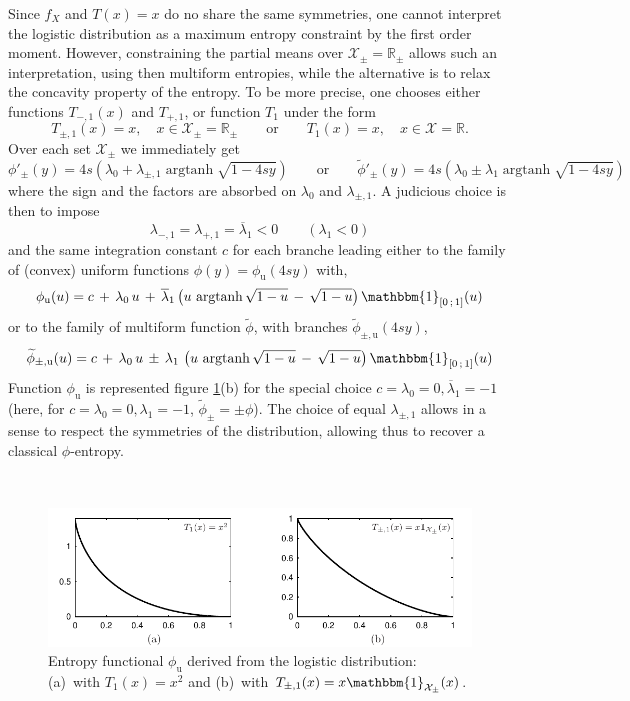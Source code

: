 \documentclass[english,sort&compress]{elsarticle}
\theoremstyle{definition}
\theoremstyle{plain}
\theoremstyle{plain}
\def\Rset{\mathbb{R}}
\def\X{\mathcal{X}}
\def\un{\mathbbm{1}}
\def\argtanh{\operatorname{argtanh}}
\begin{document}
Since $f_X$ and $T(x) = x$ do no share the same symmetries, one cannot interpret
the logistic  distribution as  a maximum entropy  constraint by the  first order
moment. However,  constraining the partial  means over $\X_\pm  = \Rset_\pm$
allows  such  an  interpretation,  using  then multiform  entropies,  while  the
alternative  is to  relax the  concavity  property of  the entropy.  To be  more
precise, one  chooses either functions $T_{-,1}(x)$ and  $T_{+,1}$, or function
$T_1$ under the form
%
\[
T_{\pm,1}(x) = x, \quad x \in  \X_\pm = \Rset_\pm \qquad \mbox{or} \qquad T_1(x)
= x,\quad x \in \X = \Rset.
\]
%
Over each set $\X_\pm$ we immediately get 
%
\[
\phi'_\pm(y)  = 4  s \left(  \lambda_0 +  \lambda_{\pm,1} \argtanh\sqrt{1-4sy}
\right)  \qquad  \mbox{or}  \qquad   \widetilde{\phi}'_\pm(y)  =  4  s  \left(
  \lambda_0 \pm \lambda_1 \argtanh\sqrt{1-4sy} \right)
\]
%
where   the   sign  and   the   factors   are   absorbed  on   $\lambda_0$   and
$\lambda_{\pm,1}$. A judicious choice is then to impose
%
\[
\lambda_{-,1} = \lambda_{+,1} = \overline{\lambda}_1 < 0 \qquad (\lambda_1 < 0)
\]
%
and the  same integration constant  $c$ for each  branche leading either  to the
family of (convex) uniform functions $\phi(y) = \phi_{\mathrm{u}}(4 s y)$ with,
%
\[
\phi_{\mathrm{u}}(u) =  c \, +  \, \lambda_0 \,  u \, +  \, \overline{\lambda}_1
\left( u \, \argtanh\sqrt{1-u} \, -  \, \sqrt{1-u} \right) \un_{\left[ 0 \, ; \,
    1 \right]}(u)
\]
%
or  to  the  family  of  multiform function  $\widetilde{\phi}$,  with  branches
$\widetilde{\phi}_{\pm,\mathrm{u}}(4 s y)$,
%
\[
\widetilde{\phi}_{\pm,\mathrm{u}}(u)  = c  \,  + \,  \lambda_0  \, u  \, \pm  \,
\lambda_1  \,  \left(  u  \,  \argtanh\sqrt{1-u}  \,  -  \,  \sqrt{1-u}  \right)
\un_{\left[ 0 \, ; \, 1 \right]}(u)
\]
%
Function $\phi_{\mathrm{u}}$ is represented figure \ref{fig:Entropy-logistic}(b)
for the special choice $c = \lambda_0 = 0, \overline{\lambda}_1 = -1$ (here, for
$c =  \lambda_0 = 0, \lambda_1  = -1$, $\widetilde{\phi}_\pm =  \pm \phi$).  The
choice of equal $\lambda_{\pm,1}$ allows in a sense to respect the symmetries of
the distribution, allowing thus to recover a classical $\phi$-entropy.

\

\begin{figure}[htbp]
\centerline{\includegraphics[width=.9\textwidth]{PDF/MaxEnt_LogisticLaw}}
\caption{Entropy  functional  $\phi_{\mathrm{u}}$   derived  from  the  logistic
  distribution:  (a)~with  $T_1(x)  =   x^2$  and  (b)~with  $T_{\pm,1}(x)  =  x
  \un_{\X_\pm}(x)$.}
\label{fig:Entropy-logistic}
\end{figure}
\end{document}
